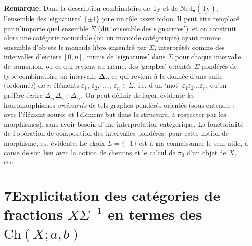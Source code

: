 \documentclass[11pt]{article}
\newcommand{\printedpage}[1]{\marginpar{\footnotesize p.~#1}}
\newcommand{\msp}[1]{\marginpar{\footnotesize [#1]}}
\newcommand{\Ch}{\underline{\mathrm{Ch}}}
\newcommand{\Ty}{\underline{\mathrm{Ty}}}
\newcommand{\Nerf}{\mathrm{Nerf}}
\begin{document}
\textbf{Remarque.} Dans la description combinatoire de $\Ty$ et de $\Nerf_\bullet(\Ty)$, l'ensemble des `signatures' $\{\pm1\}$ joue un rôle assez bidon. Il peut être remplacé par n'importe quel ensemble $\Sigma$ (dit `ensemble des signatures'), et on construit alors une catégorie monoïdale (ou un monoïde catégorique) ayant comme ensemble d'objets le monoïde libre engendré par $\Sigma$, interprétés comme des intervalles d'entiers $[0,n]$, munis de `signatures' dans $\Sigma$ pour chaque intervalle de transition, ou ce qui revient au même, des `graphes' orientés $\Sigma$-pondérés de type combinatoire un intervalle $\boldsymbol{\Delta}_i$, ce qui revient à la donnée d'une suite (ordonnée) de $n$ éléments $\varepsilon_1,\ \varepsilon_2,\ \ldots\ ,\ \varepsilon_n \in \Sigma$, i.e. d'un `mot' $\varepsilon_1\varepsilon_2\ldots\varepsilon_n$, qu'on préfère écrire $\Delta_{\varepsilon_1}\Delta_{\varepsilon_2}\cdots\Delta_{\varepsilon_n}$. On peut définir de façon évidente les homomorphismes \textit{croissants} de tels graphes pondérés orientés (sous-entendu : avec l'élément source et l'élément but dans la structure, à respecter par les morphismes), sans avoir besoin d'une interprétation catégorique. La fonctorialité de l'opération de composition des intervalles pondérés, pour cette notion de morphisme, est évidente. Le
\msp{page 59}
choix $\Sigma = \{\pm1\}$ est à ma connaissance le seul utile, à cause de son lien avec la notion de chemins et le calcul de $\pi_0$ d'un objet de $X$, etc.

\printedpage{40}
\section*{7\quad Explicitation des catégories de fractions $X\Sigma^{-1}$ en termes des $\Ch(X;a,b)$}
\end{document}

